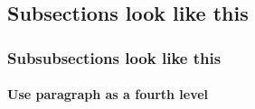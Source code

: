 \subsection{Subsections look like this}
\subsubsection{Subsubsections look like this}
\paragraph{Use paragraph as a fourth level}
